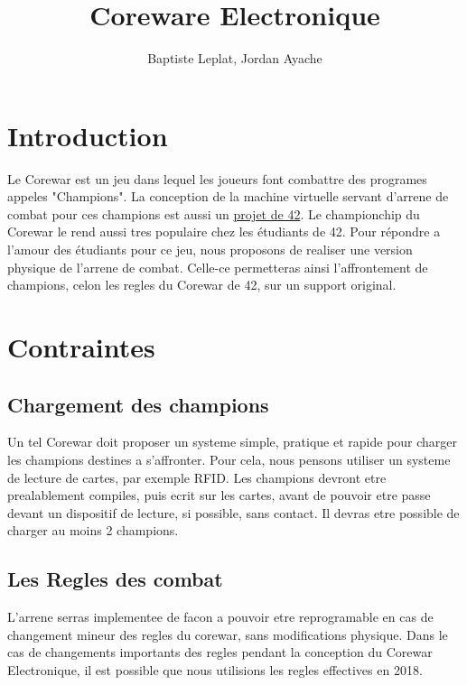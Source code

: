 \documentclass[12pt,a4paper,titlepage]{article}
\title{Coreware Electronique}
\date{}
\author{Baptiste Leplat, Jordan Ayache}
\begin{document}
    \maketitle
    \tableofcontents

      \section{Introduction}

Le Corewar est un jeu dans lequel les joueurs font combattre des programes appeles "Champions".
La conception de la machine virtuelle servant d'arrene de combat pour ces champions est aussi un \href{https://projects.intra.42.fr/projects/corewar}{projet de 42}.  
Le championchip du Corewar le rend aussi tres populaire chez les étudiants de 42. Pour répondre a l'amour des étudiants pour ce jeu, nous proposons de realiser une version physique de l'arrene de combat. Celle-ce permetteras ainsi l'affrontement de champions, celon les regles du Corewar de 42, sur un support original.  

      \section{Contraintes}

        \subsection{Chargement des champions}

Un tel Corewar doit proposer un systeme simple, pratique et rapide pour charger les champions destines a s'affronter.  
Pour cela, nous pensons utiliser un systeme de lecture de cartes, par exemple RFID.
Les champions devront etre prealablement compiles, puis ecrit sur les cartes, avant de pouvoir etre passe devant un dispositif de lecture, si possible, sans contact.  
Il devras etre possible de charger au moins 2 champions.  

        \subsection{Les Regles des combat}

L'arrene serras implementee de facon a pouvoir etre reprogramable en cas de changement mineur des regles du corewar, sans modifications physique.  
Dans le cas de changements importants des regles pendant la conception du Corewar Electronique, il est possible que nous utilisions les regles effectives en 2018.  
\end{document}
